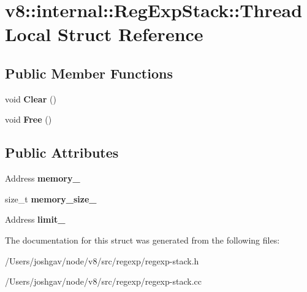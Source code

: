 \hypertarget{structv8_1_1internal_1_1_reg_exp_stack_1_1_thread_local}{}\section{v8\+:\+:internal\+:\+:Reg\+Exp\+Stack\+:\+:Thread\+Local Struct Reference}
\label{structv8_1_1internal_1_1_reg_exp_stack_1_1_thread_local}
\subsection*{Public Member Functions}
\begin{DoxyCompactItemize}
\item 
void {\bfseries Clear} ()\hypertarget{structv8_1_1internal_1_1_reg_exp_stack_1_1_thread_local_a95600755d1fe32940866566952719e30}{}\label{structv8_1_1internal_1_1_reg_exp_stack_1_1_thread_local_a95600755d1fe32940866566952719e30}

\item 
void {\bfseries Free} ()\hypertarget{structv8_1_1internal_1_1_reg_exp_stack_1_1_thread_local_a6c3fa2bd460e9a483c6c0df693efe603}{}\label{structv8_1_1internal_1_1_reg_exp_stack_1_1_thread_local_a6c3fa2bd460e9a483c6c0df693efe603}

\end{DoxyCompactItemize}
\subsection*{Public Attributes}
\begin{DoxyCompactItemize}
\item 
Address {\bfseries memory\+\_\+}\hypertarget{structv8_1_1internal_1_1_reg_exp_stack_1_1_thread_local_a4ae65404a6a000651eda7b5c4662ffa4}{}\label{structv8_1_1internal_1_1_reg_exp_stack_1_1_thread_local_a4ae65404a6a000651eda7b5c4662ffa4}

\item 
size\+\_\+t {\bfseries memory\+\_\+size\+\_\+}\hypertarget{structv8_1_1internal_1_1_reg_exp_stack_1_1_thread_local_a22d17dfa375294152b525675063512a3}{}\label{structv8_1_1internal_1_1_reg_exp_stack_1_1_thread_local_a22d17dfa375294152b525675063512a3}

\item 
Address {\bfseries limit\+\_\+}\hypertarget{structv8_1_1internal_1_1_reg_exp_stack_1_1_thread_local_a24b5bc16dfada894569dfd1f7c233ae8}{}\label{structv8_1_1internal_1_1_reg_exp_stack_1_1_thread_local_a24b5bc16dfada894569dfd1f7c233ae8}

\end{DoxyCompactItemize}


The documentation for this struct was generated from the following files\+:\begin{DoxyCompactItemize}
\item 
/\+Users/joshgav/node/v8/src/regexp/regexp-\/stack.\+h\item 
/\+Users/joshgav/node/v8/src/regexp/regexp-\/stack.\+cc\end{DoxyCompactItemize}
